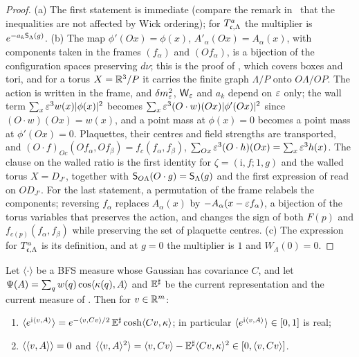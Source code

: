\begin{proof}
(a) The first statement is immediate (compare the remark in~\cite[p.~281]{BFS1} that the inequalities are not affected by Wick ordering); for $T^{a}_{\mathfrak c,\Lambda}$ the multiplier is $e^{-a_k\mathsf S_\Lambda(g)}$.
(b) The map $\phi'(Ox)=\phi(x)$, $A'_\alpha(Ox)=A_\alpha(x)$, with components taken in the frames $(f_\alpha)$ and $(Of_\alpha)$, is a bijection of the configuration spaces preserving $d\nu$; this is the proof of , which covers boxes and tori, and for a torus $X=\mathbb R^3/P$ it carries the finite graph $\Lambda/P$ onto $O\Lambda/OP$. The action is written in the frame, and $\delta m^2_{\varepsilon}$, $\mathsf W_{\varepsilon}$ and $a_k$ depend on $\varepsilon$ only; the wall term $\sum_x\varepsilon^3w(x)|\phi(x)|^2$ becomes $\sum_{x}\varepsilon^3(O\cdot w)(Ox)|\phi'(Ox)|^2$ since $(O\cdot w)(Ox)=w(x)$, and a point mass at $\phi(x)=0$ becomes a point mass at $\phi'(Ox)=0$. Plaquettes, their centres and field strengths are transported, and $(O\cdot f)_{Oc}(Of_\alpha,Of_\beta)=f_c(f_\alpha,f_\beta)$, $\sum_{Ox}\varepsilon^3(O\cdot h)(Ox)=\sum_x\varepsilon^3h(x)$. The clause on the walled ratio is the first identity for $\zeta=(\mathrm i,f;1,g)$ and the walled torus $X=D_{J'}$, together with $\mathsf S_{O\Lambda}(O\cdot g)=\mathsf S_\Lambda(g)$ and the first expression of  read on $OD_{J'}$. For the last statement, a permutation of the frame relabels the components; reversing $f_\alpha$ replaces $A_\alpha(x)$ by $-A_\alpha(x-\varepsilon f_\alpha)$, a bijection of the torus variables that preserves the action, and changes the sign of both $F(p)$ and $f_{c(p)}(f_\alpha,f_\beta)$ while preserving the set of plaquette centres.
(c) The expression for $T^{a}_{\mathfrak c,\Lambda}$ is its definition, and at $g=0$ the multiplier is $1$ and $W_\Lambda(0)=0$.
\end{proof}

\begin{lemma}\label{rot:lem:GDb}
Let $\langle\cdot\rangle$ be a BFS measure whose Gaussian has covariance $C$, and let $\Psi(A)=\sum_qw(q)\cos\langle \kappa(q),A\rangle$ and $\mathbb E^\sharp$ be the current representation and the current measure of . Then for $v\in\mathbb R^m$:
\begin{enumerate}[label=\textup{(\alph*)},leftmargin=*]
\item $\langle e^{\mathrm i\langle v,A\rangle}\rangle=e^{-\langle v,Cv\rangle/2}\,\mathbb E^\sharp\cosh\langle Cv,\kappa\rangle$; in particular $\langle e^{\mathrm i\langle v,A\rangle}\rangle\in[0,1]$ is real;
\item $\langle\langle v,A\rangle\rangle=0$ and $\langle\langle v,A\rangle^2\rangle=\langle v,Cv\rangle-\mathbb E^\sharp\langle Cv,\kappa\rangle^2\in[0,\langle v,Cv\rangle]$.
\end{enumerate}
\end{lemma}


